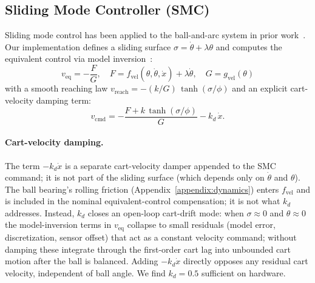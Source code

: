 \subsection{Sliding Mode Controller (SMC)}
\label{sec:smc_impl}

Sliding mode control has been applied to the ball-and-arc system in prior
work~\cite{ho2010smc,kao2018secondorder}. Our implementation defines a
sliding surface $\sigma = \dot\theta + \lambda\theta$
and computes the equivalent control via model inversion~\cite{slotine1991applied}:
\begin{equation}
  v_\text{eq} = -\frac{F}{G}, \quad
  F = f_\text{vel}(\theta,\dot\theta,\dot{x}) + \lambda\dot\theta,\quad
  G = g_\text{vel}(\theta)
  \label{eq:smc}
\end{equation}
with a smooth reaching law $v_\text{reach} = -(k/G)\,\tanh(\sigma/\phi)$
and an explicit cart-velocity damping term:
\begin{equation}
  v_\text{cmd} = -\frac{F + k\,\tanh(\sigma/\phi)}{G} - k_d\,\dot{x}.
  \label{eq:smc_full}
\end{equation}

\paragraph{Cart-velocity damping.}
The term $-k_d\dot{x}$ is a separate cart-velocity damper appended to
the SMC command; it is not part of the sliding surface (which depends
only on $\dot\theta$ and $\theta$). The ball bearing's rolling friction
(Appendix~\ref{appendix:dynamics}) enters $f_\text{vel}$ and is included in the
nominal equivalent-control compensation; it is not what $k_d$ addresses. Instead, $k_d$
closes an open-loop cart-drift mode: when $\sigma\approx 0$ and
$\theta\approx 0$ the model-inversion terms in $v_\text{eq}$ collapse to
small residuals (model error, discretization, sensor offset) that act as
a constant velocity command; without damping these integrate through
the first-order cart lag into unbounded cart motion after the ball is
balanced. Adding $-k_d\dot{x}$ directly opposes any residual cart
velocity, independent of ball angle.  We find $k_d{=}0.5$ sufficient
on hardware.

